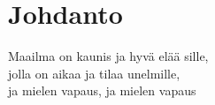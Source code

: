 \section{Johdanto}
Maailma on kaunis ja hyvä elää sille,\\
jolla on aikaa ja tilaa unelmille,\\
ja mielen vapaus, ja mielen vapaus



%
